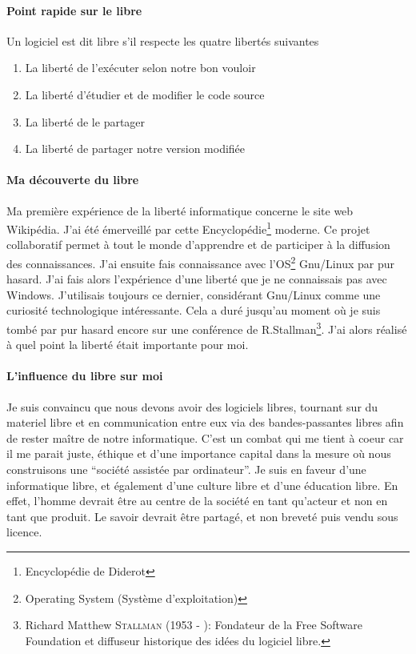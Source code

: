 \documentclass[a4paper,12pt, draft]{report}
\begin{document}
\paragraph{Point rapide sur le libre}
Un logiciel est dit libre s'il respecte les quatre libertés suivantes
\begin{enumerate}
\item La liberté de l'exécuter selon notre bon vouloir
\item La liberté d'étudier et de modifier le code source
\item La liberté de le partager
\item La liberté de partager notre version modifiée
\end{enumerate}


\paragraph{Ma découverte du libre}

Ma première expérience de la liberté informatique concerne le site web Wikipédia. J'ai été émerveillé par cette Encyclopédie\footnote{Encyclopédie de Diderot} moderne.
Ce projet collaboratif permet à tout le monde d'apprendre et de participer à la diffusion des connaissances.
J'ai ensuite fais connaissance avec l'OS\footnote{Operating System (Système d'exploitation)} Gnu/Linux par pur hasard. J'ai fais alors l'expérience d'une liberté que je ne connaissais pas avec Windows. J'utilisais toujours ce dernier, considérant Gnu/Linux comme une curiosité technologique intéressante. 
Cela a duré jusqu'au moment où je suis tombé par pur hasard encore sur une conférence de R.Stallman\footnote{Richard Matthew \textsc{Stallman} (1953 - ): Fondateur de la Free Software Foundation et diffuseur historique des idées du logiciel libre.}. J'ai alors réalisé à quel point la liberté était importante pour moi.

\paragraph{L'influence du libre sur moi}
Je suis convaincu que nous devons avoir des logiciels libres, tournant sur du materiel libre et en communication entre eux via des bandes-passantes libres afin de rester maître de notre informatique.
C'est un combat qui me tient à coeur car il me parait juste, éthique et d'une importance capital dans la mesure où nous construisons une ``société assistée par ordinateur''. Je suis en faveur d'une informatique libre, et également d'une culture libre et d'une éducation libre. En effet, l'homme devrait être au centre de la société en tant qu'acteur et non en tant que produit. Le savoir devrait être partagé, et non breveté puis vendu sous licence.
\end{document}
